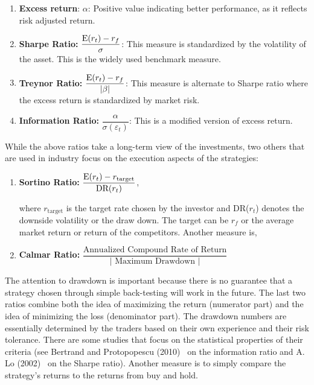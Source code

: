 \begin{enumerate}[--]
\item \textbf{Excess return}: $\alpha$: Positive value indicating better performance, as it reflects risk adjusted return. \twomedskip

\item \textbf{Sharpe Ratio: } $\dfrac{\operatorname{E}(r_{t}) - r_f}{\sigma}$: This measure is standardized by the volatility of the asset. This is the widely used benchmark measure. \twomedskip

\item \textbf{Treynor Ratio: } $\dfrac{\operatorname{E}(r_{t}) - r_f}{\left|\beta \right|}$: This measure is alternate to Sharpe ratio where the excess return is standardized by market risk. \twomedskip

\item \textbf{Information Ratio: } $\dfrac{\alpha}{\sigma(\varepsilon_{t})}$: This is a modified version of excess return.
\end{enumerate}


While the above ratios take a long-term view of the investments, two others that are used in industry focus on the execution aspects of the strategies: 


\begin{enumerate}[--]
\item \textbf{Sortino Ratio: } $\dfrac{\operatorname{E}(r_{t}) - r_{\text{target}}}{\text{DR}(r_{t})}$, \twomedskip

\noindent where $r_{\text{target}}$ is the target rate chosen by the investor and DR($r_t$) denotes the downside volatility or the draw down. The target can be $r_f$ or the average market return or return of the competitors. Another measure is, \twomedskip

\item \textbf{Calmar Ratio: } $\dfrac{\text{Annualized Compound Rate of Return}}{\left| \text{ Maximum Drawdown }\right|}$ \twomedskip
\end{enumerate}


The attention to drawdown is important because there is no guarantee that a strategy chosen through simple back-testing will work in the future. The last two ratios combine both the idea of maximizing the return (numerator part) and the idea of minimizing the loss (denominator part). The drawdown numbers are essentially determined by the traders based on their own experience and their risk tolerance. There are some studies that focus on the statistical properties of their criteria (see Bertrand and Protopopescu (2010)~\cite{bertrand} on the information ratio and A. Lo (2002)~\cite{awlo} on the Sharpe ratio). Another measure is to simply compare the strategy's returns to the returns from buy and hold.


